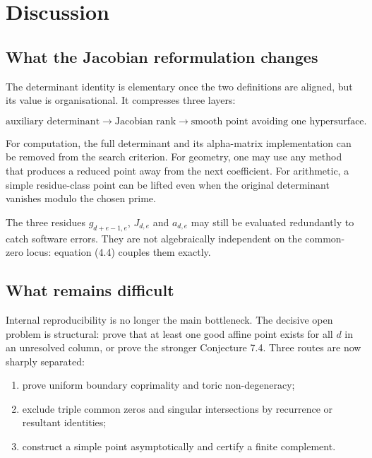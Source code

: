 \documentclass[
]{article}
\providecommand{\tightlist}{%
  \setlength{\itemsep}{0pt}\setlength{\parskip}{0pt}}
\begin{document}
\section{Discussion}\label{discussion}

\subsection{What the Jacobian reformulation
changes}\label{what-the-jacobian-reformulation-changes}

The determinant identity is elementary once the two definitions are
aligned, but its value is organisational. It compresses three layers:

\[
\text{auxiliary determinant}
\longrightarrow
\text{Jacobian rank}
\longrightarrow
\text{smooth point avoiding one hypersurface}.
\]

For computation, the full determinant and its alpha-matrix
implementation can be removed from the search criterion. For geometry,
one may use any method that produces a reduced point away from the next
coefficient. For arithmetic, a simple residue-class point can be lifted
even when the original determinant vanishes modulo the chosen prime.

The three residues \(g_{d+e-1,e}\), \(J_{d,e}\) and \(a_{d,e}\) may
still be evaluated redundantly to catch software errors. They are not
algebraically independent on the common-zero locus: equation (4.4)
couples them exactly.

\subsection{What remains difficult}\label{what-remains-difficult}

Internal reproducibility is no longer the main bottleneck. The decisive
open problem is structural: prove that at least one good affine point
exists for all \(d\) in an unresolved column, or prove the stronger
Conjecture 7.4. Three routes are now sharply separated:

\begin{enumerate}
\def\labelenumi{\arabic{enumi}.}
\tightlist
\item
  prove uniform boundary coprimality and toric non-degeneracy;
\item
  exclude triple common zeros and singular intersections by recurrence
  or resultant identities;
\item
  construct a simple point asymptotically and certify a finite
  complement.
\end{enumerate}
\end{document}
